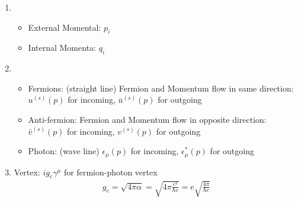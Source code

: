 \documentclass[../main.tex]{subfiles}
\begin{document}
\begin{enumerate}
    \item \begin{itemize}
        \item External Momental: $p_i$
        \item Internal Momenta: $q_i$
    \end{itemize}
    \item \begin{itemize}
        \item Fermions: (straight line) Fermion and Momentum flow in same direction: $u^{(s)}(p)$ for incoming, 
        $\bar u^{(s)}(p)$ for outgoing
        \begin{center}
        \end{center}
        \item Anti-fermion: Fermion and Momentum flow in opposite direction: 
        $\bar v^{(s)}(p)$ for incoming, $v^{(s)}(p)$ for outgoing   
        \begin{center}
        \end{center}
        \item Photon: (wave line) $\epsilon_\mu (p)$ for incoming, $\epsilon_\mu^*(p)$ for outgoing
    \end{itemize}
    \item Vertex: $i g_e \gamma^\mu$ for fermion-photon vertex
    \begin{align*}
        g_e = \sqrt{4\pi \alpha} = \sqrt{4 \pi \frac{e^2}{\hbar c}} = e \sqrt{\frac{4\pi}{\hbar c}}

\end{align*}
\end{enumerate}
\end{document}
